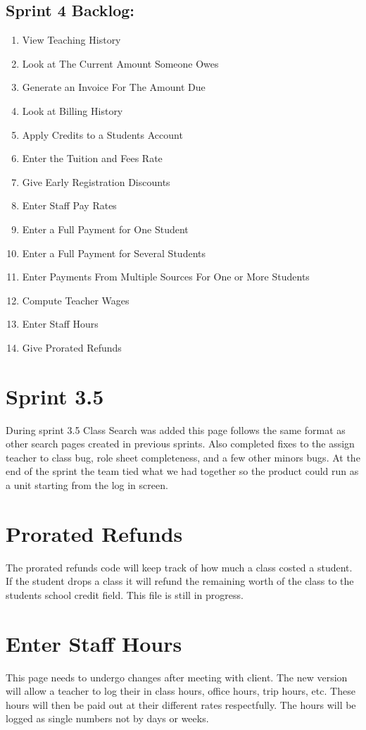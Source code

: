 \documentclass[11pt]{book}
\begin{document}
\subsection{Sprint 4 Backlog:}

\begin{enumerate}
\item View Teaching History
\item Look at The Current Amount Someone Owes
\item Generate an Invoice For The Amount Due
\item Look at Billing History
\item Apply Credits to a Students Account
\item Enter the Tuition and Fees Rate
\item Give Early Registration Discounts
\item Enter Staff Pay Rates
\item Enter a Full Payment for One Student 
\item Enter a Full Payment for Several Students
\item Enter Payments From Multiple Sources For One or More Students
\item Compute Teacher Wages 
\item Enter Staff Hours
\item Give Prorated Refunds 
\end{enumerate}

\section{Sprint 3.5}
During sprint 3.5 Class Search was added this page follows the same format as other search pages created in previous sprints. Also completed fixes to the assign teacher to class bug, role sheet completeness, and a few other minors bugs. At the end of the sprint the team tied what we had together so the product could run as a unit starting from the log in screen.

\section{Prorated Refunds}
The prorated refunds code will keep track of how much a class costed a student. If the student drops a class it will refund the remaining worth of the class to the students school credit field. This file is still in progress.

\section{Enter Staff Hours}
This page needs to undergo changes after meeting with client. The new version will allow a teacher to log their in class hours, office hours, trip hours, etc. These hours will then be paid out at their different rates respectfully. The hours will be logged as single numbers not by days or weeks.
\end{document}
